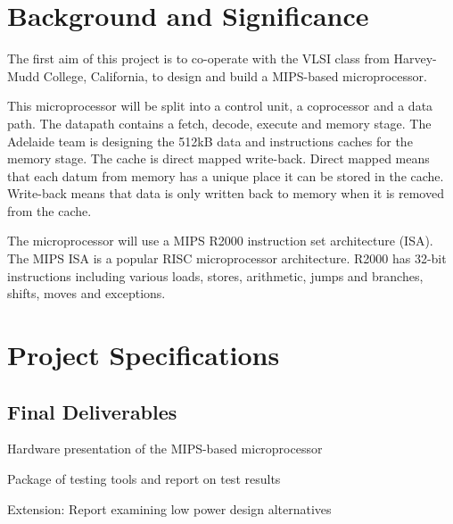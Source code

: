
\section{Background and Significance}

The first aim of this project is to co-operate with the VLSI class
from Harvey-Mudd College, California, to design and build a MIPS-based
microprocessor.

This microprocessor will be split into a control unit, a coprocessor and a data path. The datapath contains a fetch, decode, execute and memory stage. The Adelaide team is designing the 512kB data and instructions caches for the memory stage. The cache is direct mapped write-back. Direct mapped means that each datum from memory has a unique place it can be stored in the cache. Write-back means that data is only written back to memory when it is removed from the cache.

The microprocessor will use a MIPS R2000 instruction set architecture (ISA). The MIPS ISA is a popular RISC microprocessor architecture. R2000 has 32-bit instructions including various loads, stores, arithmetic, jumps and branches, shifts, moves and exceptions.

\section{Project Specifications}

\subsection{Final Deliverables}
\begin{enumerate}[{[D}1{]}]
\item Hardware presentation of the MIPS-based microprocessor
\item Package of testing tools and report on test results
\item Extension: Report examining low power design alternatives
\end{enumerate}

